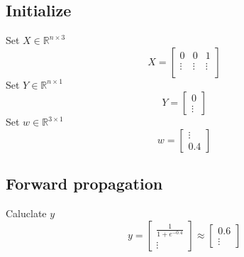 \documentclass[10pt,a4paper]{article}
\begin{document}
\subsection{Initialize}
Set $X \in \mathbb{R}^{n \times 3}$
\begin{equation}
	X =
	\begin{bmatrix}
		0 & 0 & 1 \\
		\vdots & \vdots & \vdots \\
	\end{bmatrix}
\end{equation}	
Set $Y \in \mathbb{R}^{n \times 1}$
\begin{equation}
	Y =
	\begin{bmatrix}
		0 \\
		\vdots
	\end{bmatrix}
\end{equation}
Set $w \in \mathbb{R}^{3 \times 1}$
\begin{equation}
	w =
	\begin{bmatrix}
		\vdots \\
		0.4
	\end{bmatrix}
\end{equation}

\subsection{Forward propagation}
Caluclate $y$
\begin{equation}
	y =
	\begin{bmatrix}
		\frac{1}{1+e^{-0.4}} \\
		\vdots
	\end{bmatrix}
	\approx
	\begin{bmatrix}
		0.6 \\
		\vdots
	\end{bmatrix}
\end{equation}
\end{document}
